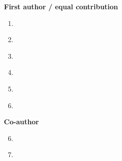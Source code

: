 


\begin{cvparagraph}
\textbf{First author / equal contribution}

\begin{enumerate}
\item {}\label{paper:midl}
\item {}\label{paper:diffusion}
\item {}\label{paper:uncertainty}
\item {}\label{paper:hopping}
\item {}\label{paper:inter}
\item {}\label{paper:quantifiable}
\end{enumerate}

\textbf{Co-author}
\begin{enumerate}
\setcounter{enumi}{5}
\item {}\label{paper:covid}
\item {}\label{paper:nature}
\end{enumerate}
\end{cvparagraph}

